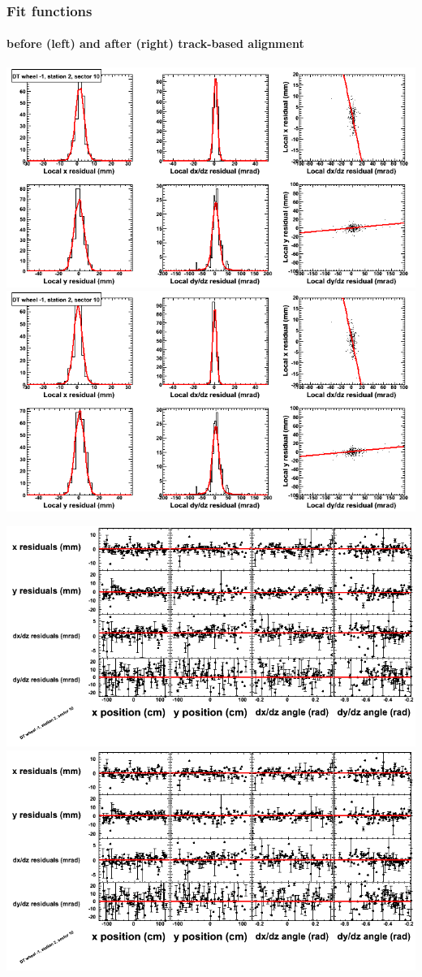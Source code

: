 \documentclass[compress]{beamer}
\begin{document}
\begin{frame}
\frametitle{Fit functions}
\framesubtitle{before (left) and after (right) track-based alignment}
\includegraphics[width=0.5\linewidth]{fitfunctions_re01/MBwhBst2sec10_bellcurves.png} \includegraphics[width=0.5\linewidth]{fitfunctions_re05/MBwhBst2sec10_bellcurves.png}

\includegraphics[width=0.5\linewidth]{fitfunctions_re01/MBwhBst2sec10_polynomials.png} \includegraphics[width=0.5\linewidth]{fitfunctions_re05/MBwhBst2sec10_polynomials.png}
\end{frame}
\end{document}
